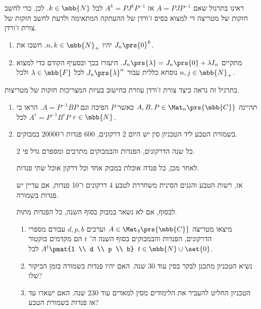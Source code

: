 \documentclass[a4paper,10pt,twoside,openany]{article}
\begin{document}
\begin{exercise}
ראינו בתרגול שאם
$A = P J P^{-1}$
אז
$A^k = P J^k P^{-1}$
לכל
$k \in \mbb{N}$.
לכן, כדי לחשב חזקות של מטריצה די למצוא בסיס ז'ורדן של ההעתקה המתאימה ולדעת לחשב חזקות של צורת ז'ורדן.

\begin{enumerate}
\item יהיו
$n,k \in \mbb{N}_+$.
חשבו את
$J_n\prs{0}^k$.

\item
מתקיים
$J_n\prs{\lambda} = J_n\prs{0} + \lambda I_n$.
היעזרו בכך ובסעיף הקודם כדי למצוא נוסחא כללית עבור
$J_n\prs{\lambda}^n$
לכל
$\lambda \in \mbb{F}$
ולכל
$n,j \in \mbb{N}_+$.
\end{enumerate}
\end{exercise}

\begin{exercise}
בתרגיל זה נראה כיצד צורת ז'ורדן עוזרת בחישוב בעיות המצריכות חזקות של מטריצות.

\begin{enumerate}
\item
תהיינה
$A,B,P \in \Mat_n\prs{\mbb{C}}$
כאשר
$P$
הפיכה וגם
$A = P^{-1} B P$.
הראו כי
$A^r = P^{-1} B^r P$
לכל
$r \in \mbb{N}$.

\item
בשמורת הטבע ליד הטכניון סין יש היום 2 דרקונים, 600 פנדות ו־20000 במבוקים.

כל שנה הדרקונים, הפנדות והבמבוקים מתרבים ומספרם גדל פי 2.

לאחר מכן, כל פנדה אוכלת במבוק אחד וכל דרקון אוכל שתי פנדות.

אז, רשות הטבע והגנים הסינית משחררת לטבע 4 דרקונים ו־10 פנדות, אם עדיין יש פנדות בשמורה.

לבסוף, אם לא נשאר במבוק בסוף השנה, כל הפנדות מתות.

\begin{enumerate}
\item
מיצאו מטריצה
$A \in \Mat_4\prs{\mbb{C}}$
וערכים
$d,p,b$
עבורם מספרי הדרקונים, הפנדות והבמבוקים בסוף השנה ה־%
$t$
הם מקדמים בוקטור
$A^t \pmat{1 \\ d \\ p \\ b}$
לכל
$t \in \mbb{N} \cup \set{0}$.

\item נשיא הטכניון מתכנן לבקר בסין עוד 30 שנה. האם יהיו פנדות בשמורה בזמן הביקור שלו?

\item הטכניון החליט להעביר את הלימודים מסין למאדים עוד 230 שנה. האם ישארו עד אז פנדות בשמורת הטבע?
\end{enumerate}
\end{enumerate}
\end{exercise}
\end{document}
